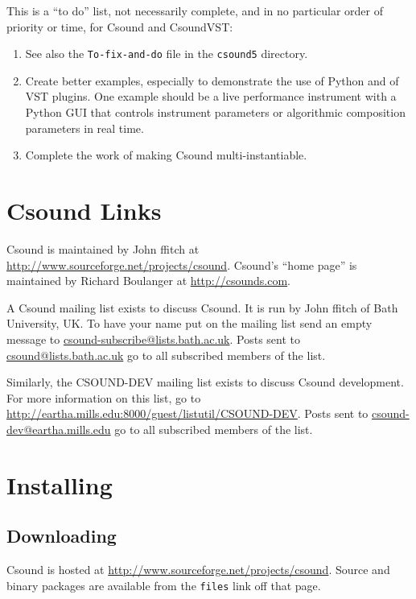 \documentclass[10pt,letterpaper,onecolumn]{book}
\begin{document}
This is a ``to do'' list, not necessarily complete, and in no particular order of priority or time, for Csound and CsoundVST:

\begin{enumerate}
\item See also the \texttt{To-fix-and-do} file in the \texttt{csound5} directory.
\item Create better examples, especially to demonstrate the use of Python and of VST plugins. One example should be a live performance instrument with a Python GUI that controls instrument parameters or algorithmic composition parameters in real time.
\item Complete the work of making Csound multi-instantiable.
\end{enumerate}

\chapter{Csound Links}

Csound is maintained by John ffitch at \url{http://www.sourceforge.net/projects/csound}. Csound's ``home page'' is maintained by Richard Boulanger at \url{http://csounds.com}. 

A Csound mailing list exists to discuss Csound. It is run by John ffitch of Bath University, UK. To have your name put on the mailing list send an empty message to \url{csound-subscribe@lists.bath.ac.uk}. Posts sent to \url{csound@lists.bath.ac.uk} go to all subscribed members of the list. 

Similarly, the CSOUND-DEV mailing list exists to discuss Csound development. For more information on this list, go to \url{http://eartha.mills.edu:8000/guest/listutil/CSOUND-DEV}. Posts sent to \url{csound-dev@eartha.mills.edu} go to all subscribed members of the list.

\chapter{Installing}

\section{Downloading}

Csound is hosted at \url{http://www.sourceforge.net/projects/csound}. \linebreak Source and binary packages are available from the \texttt{files} link off that page.
\end{document}
